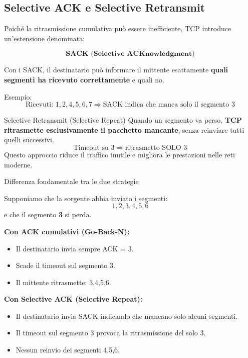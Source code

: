\documentclass[a4paper,12pt]{report}
\begin{document}
\vspace{1cm}
\subsection*{Selective ACK e Selective Retransmit}

Poiché la ritrasmissione cumulativa può essere inefficiente, TCP introduce un’estensione denominata:

\[
\textbf{SACK (Selective ACKnowledgment)}
\]

Con i SACK, il destinatario può informare il mittente esattamente \textbf{quali segmenti ha ricevuto correttamente} e quali no.

Esempio:
\[
\text{Ricevuti: } 1,2,4,5,6,7 \Rightarrow \text{SACK indica che manca solo il segmento 3}
\]

\begin{defbox}{Selective Retransmit (Selective Repeat)}
Quando un segmento va perso,  
\textbf{TCP ritrasmette esclusivamente il pacchetto mancante},  
senza reinviare tutti quelli successivi.
\[
\text{Timeout su } 3 \Rightarrow \text{ritrasmetto SOLO } 3
\]
Questo approccio riduce il traffico inutile e migliora le prestazioni nelle reti moderne.
\end{defbox}


\begin{esempiobox}{Differenza fondamentale tra le due strategie}

Supponiamo che la sorgente abbia inviato i segmenti:
\[
1,2,3,4,5,6
\]
e che il segmento \textbf{3} si perda.

\textbf{Con ACK cumulativi (Go-Back-N):}
\begin{itemize}
    \item Il destinatario invia sempre ACK = 3.
    \item Scade il timeout sul segmento 3.
    \item Il mittente ritrasmette: 3,4,5,6.
\end{itemize}

\textbf{Con Selective ACK (Selective Repeat):}
\begin{itemize}
    \item Il destinatario invia SACK indicando che mancano solo alcuni segmenti.
    \item Il timeout sul segmento 3 provoca la ritrasmissione del solo 3.
    \item Nessun reinvio dei segmenti 4,5,6.
\end{itemize}

\end{esempiobox}
\end{document}
